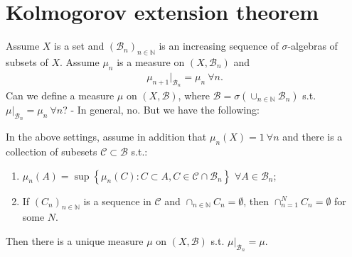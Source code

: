 \section{Kolmogorov extension theorem}
Assume \(X\) is a set and \((\mathcal{B}_n)_{n\in\mathbb{N}}\) is an increasing sequence of \(\sigma\)-algebras of subsets of \(X\). Assume \(\mu_n\) is a measure on \((X,\mathcal{B}_n)\) and 
\begin{align*}
    \mu_{n+1} \vert_{\mathcal{B}_n} = \mu_n \ \forall n.
\end{align*}
Can we define a measure \(\mu\) on \((X,\mathcal{B})\), where \(\mathcal{B}=\sigma\left(\cup_{n\in\mathbb{N}}\mathcal{B}_n\right)\) s.t. \(\mu\vert_{\mathcal{B}_n}=\mu_n \ \forall n\)? - In general, no. But we have the following:
\begin{theorem}
    In the above settings, assume in addition that \(\mu_n(X)=1\ \forall n\) and there is a collection of subesets \(\mathcal{C}\subset\mathcal{B}\) s.t.:
    \begin{enumerate}[label=(\roman*)]
        \item \(\mu_n(A)=\sup\left\{ \mu_n(C): C\subset A, C\in\mathcal{C}\cap \mathcal{B}_n \right\}\) \(\forall A\in\mathcal{B}_n\);
        \item If \((C_n)_{n\in\mathbb{N}}\) is a sequence in \(\mathcal{C}\) and \(\cap_{n\in\mathbb{N}}C_n=\emptyset\), then \(\cap_{n=1}^{N}C_n=\emptyset\) for some \(N\). 
    \end{enumerate}
    Then there is a unique measure \(\mu\) on \((X,\mathcal{B})\) s.t. \(\mu\vert_{\mathcal{B}_n} = \mu\).
\end{theorem}

